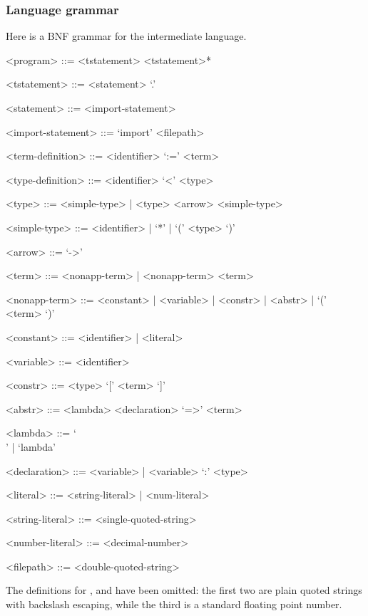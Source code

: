 \documentclass[main.tex]{subfiles}
\begin{document}
\subsubsection{Language grammar}
\label{minipass:grammar}
Here is a BNF grammar for the intermediate language.
\begin{grammar}
    <program> ::= <tstatement> <tstatement>*

    <tstatement> ::= <statement> `.'

    <statement>  ::= <import-statement>

    <import-statement> ::= `import' <filepath>

    <term-definition>  ::= <identifier> `:=' <term>

    <type-definition>  ::= <identifier> `<' <type>

    <type> ::= <simple-type> | <type> <arrow> <simple-type>

    <simple-type> ::= <identifier> | `*' | `(' <type> `)'

    <arrow> ::= `->'

    <term> ::= <nonapp-term> | <nonapp-term> <term>

    <nonapp-term> ::= <constant> | <variable> | <constr> | <abstr> | `(' <term> `)'

    <constant> ::= <identifier> | <literal>

    <variable> ::= <identifier>

    <constr> ::= <type> `[' <term> `]'

    <abstr> ::= <lambda> <declaration> `=>' <term>

    <lambda> ::= `\\' | `lambda'

    <declaration> ::= <variable> | <variable> `:' <type>

    <literal> ::= <string-literal> | <num-literal>

    <string-literal> ::= <single-quoted-string>

    <number-literal> ::= <decimal-number>

    <filepath> ::= <double-quoted-string>
\end{grammar}


  The definitions for ,
and 
have been omitted: the first two are plain quoted strings with backslash escaping,
while the third is a standard floating point number.
\end{document}
